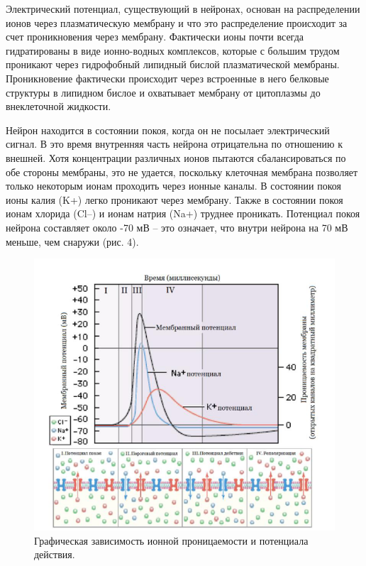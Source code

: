 \documentclass{article}
\begin{document}
        Электрический потенциал, существующий в нейронах, основан на
        распределении ионов через плазматическую мембрану и что это распределение
        происходит за счет проникновения через мембрану. Фактически ионы почти
        всегда гидратированы в виде ионно-водных комплексов, которые с большим
        трудом проникают через гидрофобный липидный бислой плазматической
        мембраны. Проникновение фактически происходит через встроенные в него
        белковые структуры в липидном бислое и охватывает мембрану от цитоплазмы
        до внеклеточной жидкости.
        \vspace*{4mm}

        Нейрон находится в состоянии покоя, когда он не посылает электрический
        сигнал. В это время внутренняя часть нейрона отрицательна по отношению к
        внешней. Хотя концентрации различных ионов пытаются сбалансироваться по
        обе стороны мембраны, это не удается, поскольку клеточная мембрана позволяет
        только некоторым ионам проходить через ионные каналы. В состоянии
        покоя ионы калия (K+) легко проникают через мембрану. Также в состоянии покоя
        ионам хлорида (Cl–) и ионам натрия (Na+) труднее проникать. Потенциал покоя
        нейрона составляет около -70 мВ – это означает, что внутри нейрона на 70 мВ
        меньше, чем снаружи (рис. 4).
        \newpage

        \begin{figure}[t]
            \centering
            \includegraphics[width=\textwidth]{data/Потенциал действия.png}
            \caption{Графическая зависимость ионной проницаемости и потенциала действия.}
        \end{figure}
\end{document}

